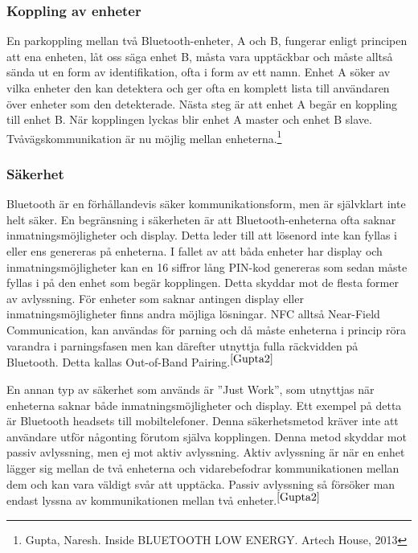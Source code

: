 \documentclass[a4paper,12pt,fleqn]{article}
\begin{document}
\subsubsection{Koppling av enheter}
En parkoppling mellan två Bluetooth-enheter, A och B, fungerar enligt principen att ena enheten, låt oss säga enhet B, måsta vara upptäckbar och måste alltså sända ut en form av identifikation, ofta i form av ett namn. Enhet A söker av vilka enheter den kan detektera och ger ofta en komplett lista till användaren över enheter som den detekterade. Nästa steg är att enhet A begär en koppling till enhet B. När kopplingen lyckas blir enhet A master och enhet B slave. Tvåvägskommunikation är nu möjlig mellan enheterna.\footnote{\label{Gupta2}Gupta, Naresh. Inside BLUETOOTH LOW ENERGY. Artech House, 2013}

\subsubsection{Säkerhet}
Bluetooth är en förhållandevis säker kommunikationsform, men är självklart inte helt säker. En begränsning i säkerheten är att Bluetooth-enheterna ofta saknar inmatningsmöjligheter och display. Detta leder till att lösenord inte kan fyllas i eller ens genereras på enheterna. I fallet av att båda enheter har display och inmatningsmöjligheter kan en 16 siffror lång PIN-kod genereras som sedan måste fyllas i på den enhet som begär kopplingen. Detta skyddar mot de flesta former av avlyssning.
För enheter som saknar antingen display eller inmatningsmöjligheter finns andra möjliga lösningar. NFC alltså Near-Field Communication, kan användas för parning och då måste enheterna i princip röra varandra i parningsfasen men kan därefter utnyttja fulla räckvidden på Bluetooth. Detta kallas Out-of-Band Pairing.$^{\ref{Gupta2}}$

En annan typ av säkerhet som används är ''Just Work'', som utnyttjas när enheterna saknar både inmatningsmöjligheter och display. Ett exempel på detta är Bluetooth headsets till mobiltelefoner. Denna säkerhetsmetod kräver inte att användare utför någonting förutom själva kopplingen. Denna metod skyddar mot passiv avlyssning, men ej mot aktiv avlyssning. 
Aktiv avlyssning är när en enhet lägger sig mellan de två enheterna och vidarebefodrar kommunikationen mellan dem och kan vara väldigt svår att upptäcka.
Passiv avlyssning så försöker man endast lyssna av kommunikationen mellan två enheter.$^{\ref{Gupta2}}$
 
\end{document}
